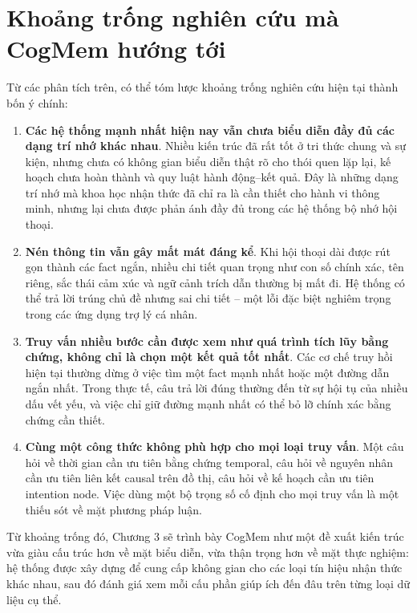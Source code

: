 \documentclass[../main.tex]{subfiles}
\begin{document}
\section{Khoảng trống nghiên cứu mà CogMem hướng tới}

Từ các phân tích trên, có thể tóm lược khoảng trống nghiên cứu hiện tại thành bốn ý chính:

\begin{enumerate}
    \item \textbf{Các hệ thống mạnh nhất hiện nay vẫn chưa biểu diễn đầy đủ các dạng trí nhớ khác nhau}. Nhiều kiến trúc đã rất tốt ở tri thức chung và sự kiện, nhưng chưa có không gian biểu diễn thật rõ cho thói quen lặp lại, kế hoạch chưa hoàn thành và quy luật hành động--kết quả. Đây là những dạng trí nhớ mà khoa học nhận thức đã chỉ ra là cần thiết cho hành vi thông minh, nhưng lại chưa được phản ánh đầy đủ trong các hệ thống bộ nhớ hội thoại.
    \item \textbf{Nén thông tin vẫn gây mất mát đáng kể}. Khi hội thoại dài được rút gọn thành các fact ngắn, nhiều chi tiết quan trọng như con số chính xác, tên riêng, sắc thái cảm xúc và ngữ cảnh trích dẫn thường bị mất đi. Hệ thống có thể trả lời trúng chủ đề nhưng sai chi tiết -- một lỗi đặc biệt nghiêm trọng trong các ứng dụng trợ lý cá nhân.
    \item \textbf{Truy vấn nhiều bước cần được xem như quá trình tích lũy bằng chứng, không chỉ là chọn một kết quả tốt nhất}. Các cơ chế truy hồi hiện tại thường dừng ở việc tìm một fact mạnh nhất hoặc một đường dẫn ngắn nhất. Trong thực tế, câu trả lời đúng thường đến từ sự hội tụ của nhiều dấu vết yếu, và việc chỉ giữ đường mạnh nhất có thể bỏ lỡ chính xác bằng chứng cần thiết.
    \item \textbf{Cùng một công thức không phù hợp cho mọi loại truy vấn}. Một câu hỏi về thời gian cần ưu tiên bằng chứng temporal, câu hỏi về nguyên nhân cần ưu tiên liên kết causal trên đồ thị, câu hỏi về kế hoạch cần ưu tiên intention node. Việc dùng một bộ trọng số cố định cho mọi truy vấn là một thiếu sót về mặt phương pháp luận.
\end{enumerate}

Từ khoảng trống đó, Chương 3 sẽ trình bày CogMem như một đề xuất kiến trúc vừa giàu cấu trúc hơn về mặt biểu diễn, vừa thận trọng hơn về mặt thực nghiệm: hệ thống được xây dựng để cung cấp không gian cho các loại tín hiệu nhận thức khác nhau, sau đó đánh giá xem mỗi cấu phần giúp ích đến đâu trên từng loại dữ liệu cụ thể.
\end{document}
